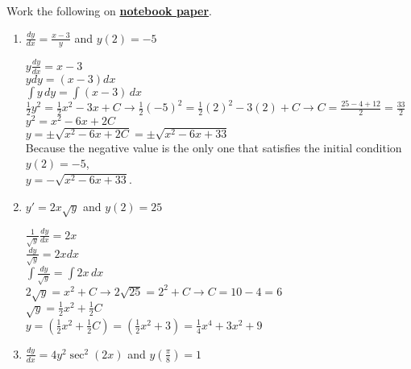 \documentclass[10pt,letterpaper]{report}
\begin{document}
Work the following on \textbf{\underline{notebook paper}}.
\begin{enumerate}
  \item{$\frac{dy}{dx}=\frac{x-3}{y}$ and $y(2)=-5$ \\}
  
    $y\frac{dy}{dx}=x-3$ \\
    
    $ydy = (x-3)dx$ \\
    
    $\int{y}\,dy=\int{\left(x-3\right)}\,dx$ \\
    
    $\frac{1}{2}y^{2}=\frac{1}{2}x^{2}-3x+C\rightarrow \frac{1}{2}\left(-5\right)^{2}=\frac{1}{2}\left(2\right)^{2}-3\left(2\right)+C\rightarrow C=\frac{25-4+12}{2}=\frac{33}{2}$ \\
    
    $y^{2}=x^{2}-6x+2C$ \\
    
    $y=\pm\sqrt{x^{2}-6x+2C}=\pm\sqrt{x^{2}-6x+33}$ \\
    
    Because the negative value is the only one that satisfies the initial condition $y(2)=-5$, \\ $y=-\sqrt{x^{2}-6x+33}$. \\
    
  \item{$y'=2x\sqrt{y}$ and $y(2)=25$ \\}
  
    $\frac{1}{\sqrt{y}}\frac{dy}{dx}=2x$ \\
    
    $\frac{dy}{\sqrt{y}}=2xdx$ \\
    
    $\int{\frac{dy}{\sqrt{y}}}=\int{2x}\,dx$ \\
    
    $2\sqrt{y}=x^{2}+C\rightarrow 2\sqrt{25}=2^{2}+C\rightarrow C=10-4=6$ \\
    
    $\sqrt{y}=\frac{1}{2}x^{2}+\frac{1}{2}C$ \\
    
    $y=\left(\frac{1}{2}x^{2}+\frac{1}{2}C\right)=\left(\frac{1}{2}x^{2}+3\right)=\frac{1}{4}x^{4}+3x^{2}+9$ \\
    
  \item{$\frac{dy}{dx}=4y^{2}\sec^{2}{\left(2x\right)}$ and $y\left(\frac{\pi}{8}\right)=1$ \\}
  

\end{enumerate}
\end{document}
